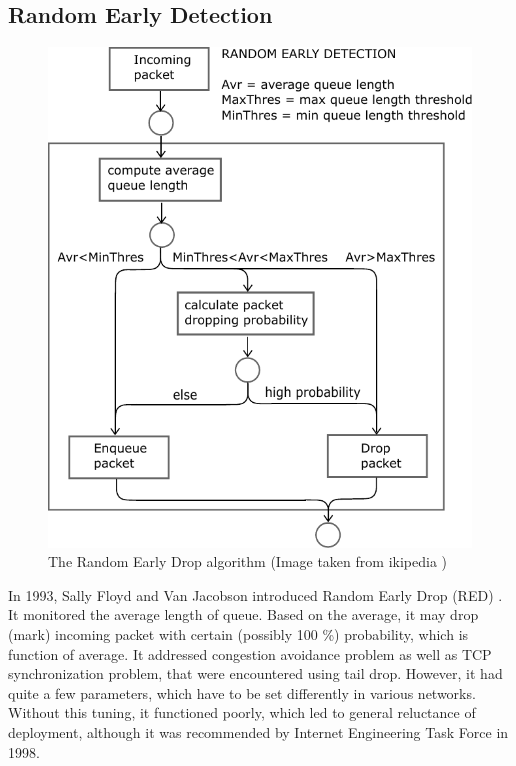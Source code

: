 
\subsection{Random Early Detection}

\begin{figure}
	\centering
	\includegraphics[width=137mm]{drawings/RED}
	\caption{The Random Early Drop algorithm (Image taken from ikipedia \cite{RED:picture}) }
	
	\label{fig04:RED}
\end{figure}


In 1993, Sally Floyd and Van Jacobson introduced Random Early Drop (RED) \cite{Floyd:1993:RED:169931.169935}. It monitored the average length of queue. Based on the average, it may drop (mark) incoming packet with certain (possibly 100 \%) probability, which is function of average. It addressed congestion avoidance problem as well as TCP synchronization problem, that were encountered using tail drop. However, it had quite a few parameters, which have to be set differently in various networks. Without this tuning, it functioned poorly, which led to general reluctance of deployment, although it was recommended by Internet Engineering Task Force \cite{rfc2309} in 1998.

